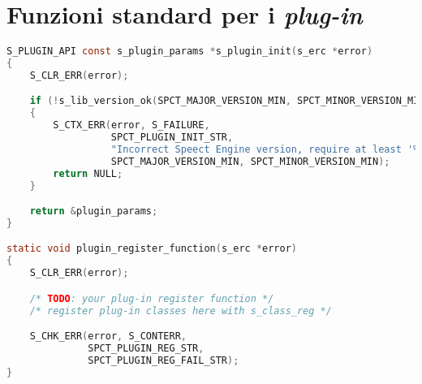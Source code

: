 
\chapter{Funzioni standard per i \textit{plug-in}}
\label{app:appb}

\begin{lstlisting}[language=C]
S_PLUGIN_API const s_plugin_params *s_plugin_init(s_erc *error)
{
    S_CLR_ERR(error);

    if (!s_lib_version_ok(SPCT_MAJOR_VERSION_MIN, SPCT_MINOR_VERSION_MIN))
    {
        S_CTX_ERR(error, S_FAILURE,
                  SPCT_PLUGIN_INIT_STR,
                  "Incorrect Speect Engine version, require at least '%d.%d.x'",
                  SPCT_MAJOR_VERSION_MIN, SPCT_MINOR_VERSION_MIN);
        return NULL;
    }

    return &plugin_params;
}

static void plugin_register_function(s_erc *error)
{
    S_CLR_ERR(error);

    /* TODO: your plug-in register function */
    /* register plug-in classes here with s_class_reg */

    S_CHK_ERR(error, S_CONTERR,
              SPCT_PLUGIN_REG_STR,
              SPCT_PLUGIN_REG_FAIL_STR);
}

\end{lstlisting}
